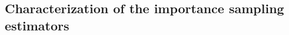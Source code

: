 \documentclass[review]{elsarticle}
\newcommand{\normalized}{\tilde}
\newcommand{\Zc}{\mathcal{Z}}
\begin{document}

\subsection{Characterization of the importance sampling estimators}
\end{document}
